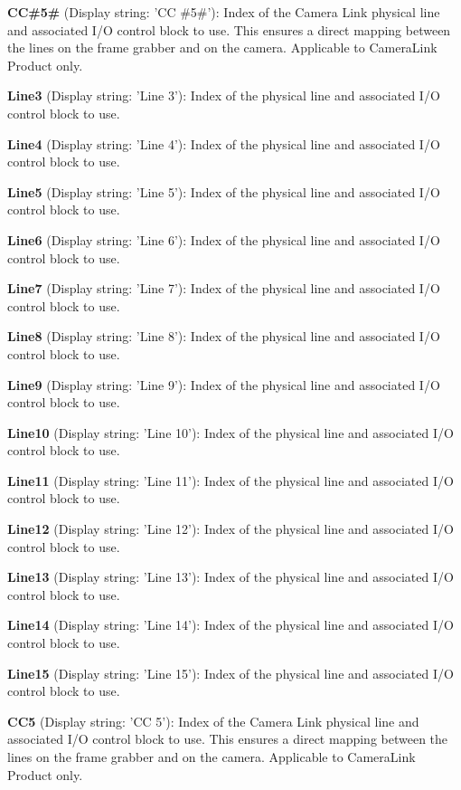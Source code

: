 \begin{DoxyItemize}
\item {\bfseries C\+C\#5\#} (Display string\+: 'C\+C \#5\#')\+: Index of the Camera Link physical line and associated I/\+O control block to use. This ensures a direct mapping between the lines on the frame grabber and on the camera. Applicable to Camera\+Link Product only.
\item {\bfseries Line3} (Display string\+: 'Line 3')\+: Index of the physical line and associated I/\+O control block to use.
\item {\bfseries Line4} (Display string\+: 'Line 4')\+: Index of the physical line and associated I/\+O control block to use.
\item {\bfseries Line5} (Display string\+: 'Line 5')\+: Index of the physical line and associated I/\+O control block to use.
\item {\bfseries Line6} (Display string\+: 'Line 6')\+: Index of the physical line and associated I/\+O control block to use.
\item {\bfseries Line7} (Display string\+: 'Line 7')\+: Index of the physical line and associated I/\+O control block to use.
\item {\bfseries Line8} (Display string\+: 'Line 8')\+: Index of the physical line and associated I/\+O control block to use.
\item {\bfseries Line9} (Display string\+: 'Line 9')\+: Index of the physical line and associated I/\+O control block to use.
\item {\bfseries Line10} (Display string\+: 'Line 10')\+: Index of the physical line and associated I/\+O control block to use.
\item {\bfseries Line11} (Display string\+: 'Line 11')\+: Index of the physical line and associated I/\+O control block to use.
\item {\bfseries Line12} (Display string\+: 'Line 12')\+: Index of the physical line and associated I/\+O control block to use.
\item {\bfseries Line13} (Display string\+: 'Line 13')\+: Index of the physical line and associated I/\+O control block to use.
\item {\bfseries Line14} (Display string\+: 'Line 14')\+: Index of the physical line and associated I/\+O control block to use.
\item {\bfseries Line15} (Display string\+: 'Line 15')\+: Index of the physical line and associated I/\+O control block to use.
\item {\bfseries C\+C5} (Display string\+: 'C\+C 5')\+: Index of the Camera Link physical line and associated I/\+O control block to use. This ensures a direct mapping between the lines on the frame grabber and on the camera. Applicable to Camera\+Link Product only.

\end{DoxyItemize}
